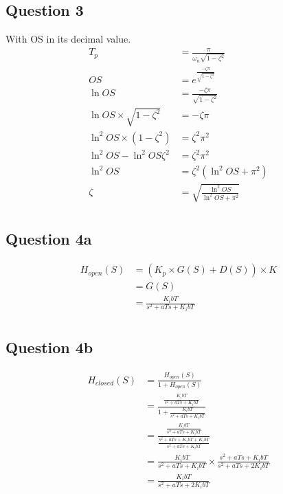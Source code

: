 \documentclass{article}
\begin{document}
\subsection*{Question 3} %
\label{sub:question_3}
With OS in its decimal value.
\begin{align*}
T_p &= \frac{\pi}{\omega_n\sqrt{1-\zeta^2}}\\
OS &= e^{\frac{-\zeta\pi}{\sqrt{1- \zeta^2}}}\\
\ln{OS} &= \frac{-\zeta\pi}{\sqrt{1- \zeta^2}}\\
\ln{OS} \times \sqrt{1- \zeta^2} &= -\zeta\pi\\
\ln^2{OS} \times (1- \zeta^2) &= \zeta^2\pi^2\\
\ln^2{OS} - \ln^2{OS}\zeta^2 &= \zeta^2\pi^2\\
\ln^2{OS}  &= \zeta^2(\ln^2{OS} + \pi^2)\\
\zeta &= \sqrt{\frac{\ln^2{OS}}{\ln^2{OS} + \pi^2}}\\
\end{align*}


\subsection*{Question 4a} %
\label{sub:question_4a}

\begin{align*}
    H_{open}(S) &= (K_p \times G(S) + D(S)) \times K\\
         &= G(S)\\
         &= \frac{K_ibT}{s^2 + aTs + K_ibT}\\
\end{align*}


\subsection*{Question 4b} %
\label{sub:question_4b}
\begin{align*}
    H_{closed}(S) &=  \frac{H_{open}(S)}{1 + H_{open}(S)}\\
         &= \frac{\frac{K_ibT}{s^2 + aTs + K_ibT}}{1 + \frac{K_ibT}{s^2 + aTs + K_ibT}}\\
         &= \frac{\frac{K_ibT}{s^2 + aTs + K_ibT}}{\frac{s^2 + aTs + K_ibT + K_ibT}{s^2 + aTs + K_ibT}}\\
         &= \frac{K_ibT}{s^2 + aTs + K_ibT} \times \frac{s^2 + aTs + K_ibT}{s^2 + aTs + 2K_ibT}\\
         &= \frac{K_ibT}{s^2 + aTs + 2K_ibT}\\
\end{align*}
\end{document}
